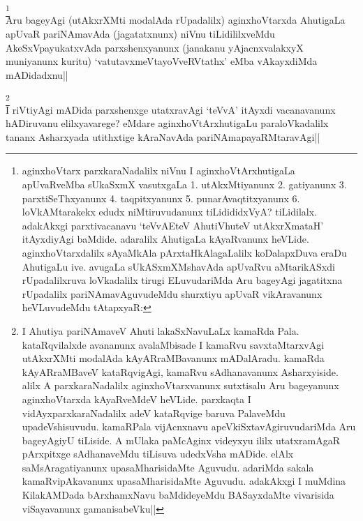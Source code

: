 \begin{artha}
\footnote[1]{aginxhoVtarx parxkaraNadalilx niVnu I 
aginxhoVtArxhutigaLa apUvaRveMba sUkaSxmX vasutxgaLa 1. utAkxMtiyanunx 
2. gatiyanunx 3. parxtiSeThxyanunx 4. taqpitxyanunx 5. 
punarAvaqtitxyanunx 6. loVkAMtarakekx edudx niMtiruvudanunx 
tiLidididxVyA? tiLidilalx. adakAkxgi parxtivacanavu `teVvAEteV 
AhutiVhuteV utAkxrXmataH' itAyxdiyAgi baMdide. adaralilx AhutigaLa 
kAyaRvanunx heVLide. aginxhoVtarxdalilx sAyaMkAla pArxtaHkAlagaLalilx 
koDalapxDuva eraDu AhutigaLu ive. avugaLa sUkASxmXMshavAda apUvaRvu 
aMtarikASxdi rUpadalilxruva loVkadalilx tirugi ELuvudariMda Aru 
bageyAgi jagatitxna rUpadalilx pariNAmavAguvudeMdu shurxtiyu apUvaR 
vikAravanunx heVLuvudeMdu tAtapxyaR:}\\
Aru bageyAgi (utAkxrXMti modalAda rUpadalilx) aginxhoVtarxda AhutigaLa 
apUvaR pariNAmavAda (jagatatxnunx) niVnu tiLidililxveMdu 
AkeSxVpayukatxvAda parxshenxyanunx (janakanu yAjacnxvalakxyX 
muniyanunx kuritu) `vatutavxmeVtayoVveRVtathx' eMba vAkayxdiMda 
mADidadxnu||
\end{artha}

\begin{artha}
\footnote[2]{I Ahutiya pariNAmaveV Ahuti lakaSxNavuLaLx kamaRda Pala. 
kataRqvilalxde avananunx avalaMbisade I kamaRvu savxtaMtarxvAgi 
utAkxrXMti modalAda kAyARraMBavanunx mADalAradu. kamaRda kAyARraMBaveV 
kataRqvigAgi, kamaRvu sAdhanavanunx Asharxyiside. alilx A 
parxkaraNadalilx aginxhoVtarxvanunx sutxtisalu Aru bageyanunx 
aginxhoVtarxda kAyaRveMdeV heVLide. parxkaqta I vidAyxparxkaraNadalilx 
adeV kataRqvige baruva PalaveMdu upadeVshisuvudu. kamaRPala 
vijAcnxnavu apeVkiSxtavAgiruvudariMda Aru bageyAgiyU tiLiside. A 
mUlaka paMcAginx videyxyu ililx utatxramAgaR pArxpitxge sAdhanaveMdu 
tiLisuva udedxVsha mADide. elAlx saMsAragatiyanunx upasaMharisidaMte 
Aguvudu. adariMda sakala kamaRvipAkavanunx upasaMharisidaMte Aguvudu. 
adakAkxgi I muMdina KilakAMDada bArxhamxNavu baMdideyeMdu BASayxdaMte 
vivarisida viSayavanunx gamanisabeVku||}\\
I riVtiyAgi mADida parxshenxge utatxravAgi `teVvA' itAyxdi 
vacanavanunx hADiruvanu elilxyavarege? eMdare aginxhoVtArxhutigaLu 
paraloVkadalilx tananx Asharxyada utithxtige kAraNavAda 
pariNAmapayaRMtaravAgi||
\end{artha}

\begin{artha}

\end{artha}

\begin{artha}

\end{artha}

\begin{artha}

\end{artha}

\begin{artha}

\end{artha}

\begin{artha}

\end{artha}

\begin{artha}

\end{artha}
